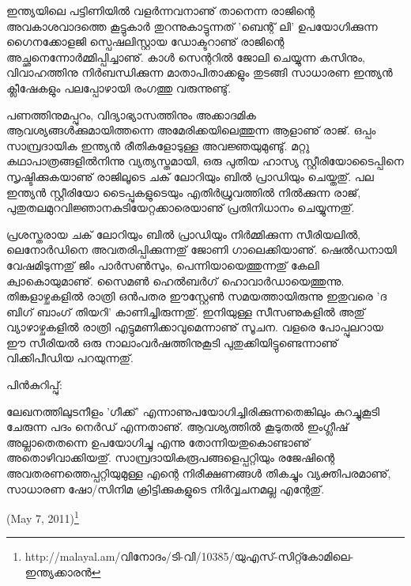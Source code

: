 ഇന്ത്യയിലെ പട്ടിണിയില്‍ വളര്‍ന്നവനാണു് താനെന്ന രാജിന്റെ അവകാശവാദത്തെ കൂട്ടുകാര്‍ തുറന്നുകാട്ടുന്നത് 'ബെന്റ് ലി' 
ഉപയോഗിക്കുന്ന ഗൈനക്കോളജി സ്പെഷലിസ്റ്റായ ഡോക്ടറാണു് രാജിന്റെ അച്ഛനെന്നോര്‍മ്മിപ്പിച്ചാണു്. കാള്‍ സെന്ററില്‍ ജോലി 
ചെയ്യുന്ന കസിനും, വിവാഹത്തിനു നിര്‍ബന്ധിക്കുന്ന മാതാപിതാക്കളും തുടങ്ങി സാധാരണ ഇന്ത്യന്‍ ക്ലീഷേകളും പലപ്പോഴായി
 രംഗത്തു വരുന്നുണ്ടു്.

പണത്തിനുമപ്പുറം, വിദ്യാഭ്യാസത്തിനും അക്കാദമിക ആവശ്യങ്ങള്‍ക്കുമായിത്തന്നെ അമേരിക്കയിലെത്തുന്ന ആളാണു് രാജ്. ഒപ്പം 
സാമ്പ്രദായിക ഇന്ത്യന്‍ രീതികളോടുള്ള അവജ്ഞയുമുണ്ടു്. മറ്റു കഥാപാത്രങ്ങളില്‍നിന്നു വ്യത്യസ്തമായി, ഒരു പുതിയ ഹാസ്യ 
സ്റ്റീരിയോടൈപ്പിനെ സൃഷ്ടിക്കുകയാണു് രാജിലൂടെ ചക് ലോറിയും ബില്‍ പ്രാഡിയും ചെയ്തതു്. പല ഇന്ത്യന്‍ സ്റ്റീരിയോ ടൈപ്പുകളുടെയും 
എതിര്‍ധ്രുവത്തില്‍ നില്‍ക്കുന്ന രാജ്, പുതുതലമുറവിജ്ഞാനകുടിയേറ്റക്കാരെയാണു് പ്രതിനിധാനം ചെയ്യുന്നതു്.

പ്രശസ്തരായ ചക് ലോറിയും ബില്‍ പ്രാഡിയും നിര്‍മ്മിക്കുന്ന സീരിയലില്‍, ലെനോര്‍ഡിനെ അവതരിപ്പിക്കുന്നതു് ജോണി 
ഗാലെക്കിയാണു്. ഷെല്‍ഡനായി വേഷമിടുന്നതു് ജിം പാര്‍സണ്‍സും, പെന്നിയായെത്തുന്നതു് കേലി ക്വാകൊയുമാണു്. സൈമണ്‍ 
ഹെല്‍ബര്‍ഗ് ഹൊവാര്‍ഡായെത്തുന്നു. തിങ്കളാഴ്ചകളില്‍ രാത്രി ഒന്‍പതര ഈസ്റ്റേണ്‍ സമയത്തായിരുന്നു ഇതുവരെ 
'ദ ബിഗ് ബാംഗ് തിയറി' കാണിച്ചിരുന്നതു്. ഇനിയുള്ള സീസണുകളില്‍ അതു് വ്യാഴാഴ്ചകളില്‍ രാത്രി എട്ടുമണിക്കാവുമെന്നാണു് സൂചന. 
വളരെ പോപ്പുലറായ ഈ സീരിയല്‍ ഒരു നാലാംവര്‍ഷത്തിനുകൂടി പുതുക്കിയിട്ടുണ്ടെന്നാണു് വിക്കിപീഡിയ പറയുന്നതു്.

പിന്‍കുറിപ്പു്:

ലേഖനത്തിലുടനീളം 'ഗീക്ക്' എന്നാണുപയോഗിച്ചിരിക്കുന്നതെങ്കിലും കുറച്ചുകൂടി ചേരുന്ന പദം  നെര്‍ഡ് എന്നതാണു്. 
 ആവശ്യത്തില്‍ കൂടുതല്‍ ഇംഗ്ലീഷ് അല്ലാതെതന്നെ ഉപയോഗിച്ചു എന്നു തോന്നിയതുകൊണ്ടാണു് അതൊഴിവാക്കിയതു്. 
 സാമ്പ്രദായികരൂപങ്ങളെപ്പറ്റിയും രജേഷിന്റെ അവതരണത്തെപ്പറ്റിയുമുള്ള എന്റെ നിരീക്ഷണങ്ങള്‍ തികച്ചും വ്യക്തിപരമാണു്, 
 സാധാരണ ഷോ/സിനിമ ക്രിട്ടിക്കുകളുടെ നിര്‍വ്വചനമല്ല എന്റേതു്.
 
\begin{flushright} (May 7, 2011)\footnote{http://malayal.am/വിനോദം/ടി-വി/10385/യുഎസ്-സിറ്റ്കോമിലെ-ഇന്ത്യക്കാരന്‍}\end{flushright}

\newpage
